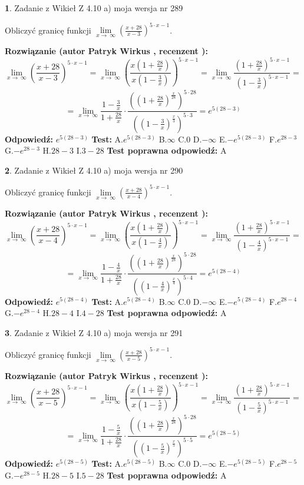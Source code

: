 \documentclass[12pt, a4paper]{article}
\theoremstyle{definition} %
\newtheorem{zad}{}
\newcommand{\zadStart}[1]{\begin{zad}#1\newline}
\newcommand{\zadStop}{\end{zad}}
\newcommand{\rozwStart}[2]{\noindent \textbf{Rozwiązanie (autor #1 , recenzent #2): }\newline}
\newcommand{\rozwStop}{\newline}
\newcommand{\odpStart}{\noindent \textbf{Odpowiedź:}\newline}
\newcommand{\odpStop}{\newline}
\newcommand{\testStart}{\noindent \textbf{Test:}\newline}
\newcommand{\testStop}{\newline}
\newcommand{\kluczStart}{\noindent \textbf{Test poprawna odpowiedź:}\newline}
\newcommand{\kluczStop}{\newline}
\begin{document}
\zadStart{Zadanie z Wikieł Z 4.10 a) moja wersja nr 289}


Obliczyć granicę funkcji  $\lim\limits_{x\to\ \infty}(\frac{x+28}{x-3})^{5\cdot x-1}$.
\zadStop
\rozwStart{Patryk Wirkus}{}
$$\lim\limits_{x\to\ \infty}(\frac{x+28}{x-3})^{5\cdot x-1} = \lim\limits_{x\to\ \infty}(\frac{x(1+\frac{28}{x})}{x(1-\frac{3}{x})})^{5\cdot x-1}=\lim\limits_{x\to\ \infty}\frac{(1+\frac{28}{x})^{5\cdot x-1}}{(1-\frac{3}{x})^{5\cdot x-1}}=$$
$$=\lim\limits_{x\to\ \infty}\frac{1-\frac{3}{x}}{1+\frac{28}{x}}\cdot\frac{((1+\frac{28}{x})^{\frac{x}{28}})^{5\cdot28}}{((1-\frac{3}{x})^{\frac{x}{3}})^{5\cdot3}}=e^{5(28-3)}$$
\rozwStop
\odpStart
$e^{5(28-3)}$
\odpStop
\testStart
A.$e^{5(28-3)}$ B.$\infty$ C.$0$ D.$-\infty$ E.$-e^{5(28-3)}$
F.$e^{28-3}$ G.$-e^{28-3}$
H.$28-3$
I.$3-28$
\testStop
\kluczStart
A
\kluczStop



\zadStart{Zadanie z Wikieł Z 4.10 a) moja wersja nr 290}


Obliczyć granicę funkcji  $\lim\limits_{x\to\ \infty}(\frac{x+28}{x-4})^{5\cdot x-1}$.
\zadStop
\rozwStart{Patryk Wirkus}{}
$$\lim\limits_{x\to\ \infty}(\frac{x+28}{x-4})^{5\cdot x-1} = \lim\limits_{x\to\ \infty}(\frac{x(1+\frac{28}{x})}{x(1-\frac{4}{x})})^{5\cdot x-1}=\lim\limits_{x\to\ \infty}\frac{(1+\frac{28}{x})^{5\cdot x-1}}{(1-\frac{4}{x})^{5\cdot x-1}}=$$
$$=\lim\limits_{x\to\ \infty}\frac{1-\frac{4}{x}}{1+\frac{28}{x}}\cdot\frac{((1+\frac{28}{x})^{\frac{x}{28}})^{5\cdot28}}{((1-\frac{4}{x})^{\frac{x}{4}})^{5\cdot4}}=e^{5(28-4)}$$
\rozwStop
\odpStart
$e^{5(28-4)}$
\odpStop
\testStart
A.$e^{5(28-4)}$ B.$\infty$ C.$0$ D.$-\infty$ E.$-e^{5(28-4)}$
F.$e^{28-4}$ G.$-e^{28-4}$
H.$28-4$
I.$4-28$
\testStop
\kluczStart
A
\kluczStop



\zadStart{Zadanie z Wikieł Z 4.10 a) moja wersja nr 291}


Obliczyć granicę funkcji  $\lim\limits_{x\to\ \infty}(\frac{x+28}{x-5})^{5\cdot x-1}$.
\zadStop
\rozwStart{Patryk Wirkus}{}
$$\lim\limits_{x\to\ \infty}(\frac{x+28}{x-5})^{5\cdot x-1} = \lim\limits_{x\to\ \infty}(\frac{x(1+\frac{28}{x})}{x(1-\frac{5}{x})})^{5\cdot x-1}=\lim\limits_{x\to\ \infty}\frac{(1+\frac{28}{x})^{5\cdot x-1}}{(1-\frac{5}{x})^{5\cdot x-1}}=$$
$$=\lim\limits_{x\to\ \infty}\frac{1-\frac{5}{x}}{1+\frac{28}{x}}\cdot\frac{((1+\frac{28}{x})^{\frac{x}{28}})^{5\cdot28}}{((1-\frac{5}{x})^{\frac{x}{5}})^{5\cdot5}}=e^{5(28-5)}$$
\rozwStop
\odpStart
$e^{5(28-5)}$
\odpStop
\testStart
A.$e^{5(28-5)}$ B.$\infty$ C.$0$ D.$-\infty$ E.$-e^{5(28-5)}$
F.$e^{28-5}$ G.$-e^{28-5}$
H.$28-5$
I.$5-28$
\testStop
\kluczStart
A
\kluczStop
\end{document}
